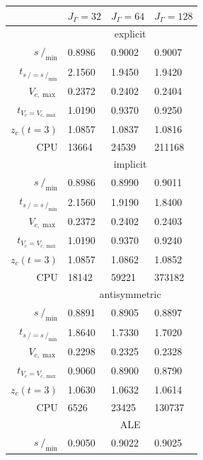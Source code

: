 \documentclass[a4paper,12pt,onecolumn]{article}
\newcommand{\strikes}{\mbox{$s\!\!\!\!\:/$}}
\begin{document}
\begin{table}
\center
\hspace*{-3.25cm}
\begin{tabular}{rlll}
\hline
 & $J_\Gamma=32$ & $J_\Gamma=64$ & $J_\Gamma=128$ \\
\hline
& \multicolumn{3}{c}{explicit} \\
\cmidrule{2-4}
$\strikes_{\min}$                & 0.8986 & 0.9002 & 0.9007 \\
$t_{\strikes = \strikes_{\min}}$ & 2.1560 & 1.9450 & 1.9420 \\
$V_{c,\max}$                     & 0.2372 & 0.2402 & 0.2404 \\
$t_{V_c = V_{c,\max}}$           & 1.0190 & 0.9370 & 0.9250 \\
$z_c(t=3)$                       & 1.0857 & 1.0837 & 1.0816 \\
CPU                              &  13664 &  24539 & 211168 \\
\cmidrule{2-4}
& \multicolumn{3}{c}{implicit} \\
\cmidrule{2-4}
$\strikes_{\min}$                & 0.8986 & 0.8990 & 0.9011 \\
$t_{\strikes = \strikes_{\min}}$ & 2.1560 & 1.9190 & 1.8400 \\
$V_{c,\max}$                     & 0.2372 & 0.2402 & 0.2403 \\
$t_{V_c = V_{c,\max}}$           & 1.0190 & 0.9370 & 0.9240 \\
$z_c(t=3)$                       & 1.0857 & 1.0862 & 1.0852 \\
CPU                              &  18142 &  59221 & 373182 \\
\cmidrule{2-4}
& \multicolumn{3}{c}{antisymmetric} \\
\cmidrule{2-4}
$\strikes_{\min}$                & 0.8891 & 0.8905 & 0.8897 \\
$t_{\strikes = \strikes_{\min}}$ & 1.8640 & 1.7330 & 1.7020 \\
$V_{c,\max}$                     & 0.2298 & 0.2325 & 0.2328 \\
$t_{V_c = V_{c,\max}}$           & 0.9060 & 0.8900 & 0.8790 \\
$z_c(t=3)$                       & 1.0630 & 1.0632 & 1.0614 \\
CPU                              &   6526 &  23425 & 130737 \\
\cmidrule{2-4}
& \multicolumn{3}{c}{ALE} \\
\cmidrule{2-4}
$\strikes_{\min}$                & 0.9050 & 0.9022 & 0.9025 \\

\end{tabular}
\end{table}
\end{document}
